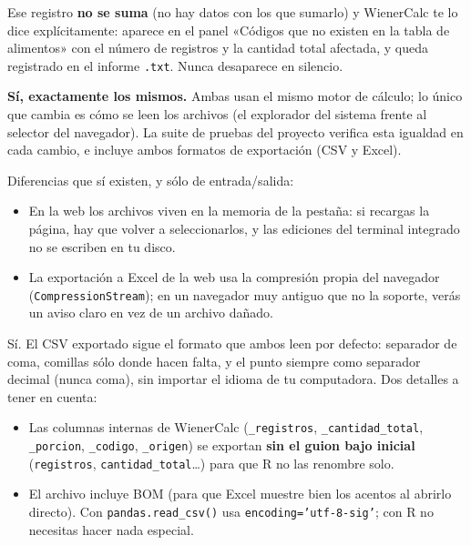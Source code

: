 \documentclass[11pt,a4paper]{article}
\begin{document}
\vspace{0.3cm}

\begin{warningbox}
Ese registro \textbf{no se suma} (no hay datos con los que sumarlo) y WienerCalc te lo dice explícitamente: aparece en el panel «Códigos que no existen en la tabla de alimentos» con el número de registros y la cantidad total afectada, y queda registrado en el informe \texttt{.txt}. Nunca desaparece en silencio.
\end{warningbox}

\vspace{0.3cm}

\begin{faqbox}
\textbf{Sí, exactamente los mismos.} Ambas usan el mismo motor de cálculo; lo único que cambia es cómo se leen los archivos (el explorador del sistema frente al selector del navegador). La suite de pruebas del proyecto verifica esta igualdad en cada cambio, e incluye ambos formatos de exportación (CSV y Excel).

Diferencias que sí existen, y sólo de entrada/salida:
\begin{itemize}
    \item En la web los archivos viven en la memoria de la pestaña: si recargas la página, hay que volver a seleccionarlos, y las ediciones del terminal integrado no se escriben en tu disco.
    \item La exportación a Excel de la web usa la compresión propia del navegador (\texttt{CompressionStream}); en un navegador muy antiguo que no la soporte, verás un aviso claro en vez de un archivo dañado.
\end{itemize}
\end{faqbox}

\vspace{0.3cm}

\begin{faqbox}
Sí. El CSV exportado sigue el formato que ambos leen por defecto: separador de coma, comillas sólo donde hacen falta, y el punto siempre como separador decimal (nunca coma), sin importar el idioma de tu computadora. Dos detalles a tener en cuenta:
\begin{itemize}
    \item Las columnas internas de WienerCalc (\texttt{\_registros}, \texttt{\_cantidad\_total}, \texttt{\_porcion}, \texttt{\_codigo}, \texttt{\_origen}) se exportan \textbf{sin el guion bajo inicial} (\texttt{registros}, \texttt{cantidad\_total}\ldots) para que R no las renombre solo.
    \item El archivo incluye BOM (para que Excel muestre bien los acentos al abrirlo directo). Con \texttt{pandas.read\_csv()} usa \texttt{encoding='utf-8-sig'}; con R no necesitas hacer nada especial.
\end{itemize}
\end{faqbox}
\end{document}
